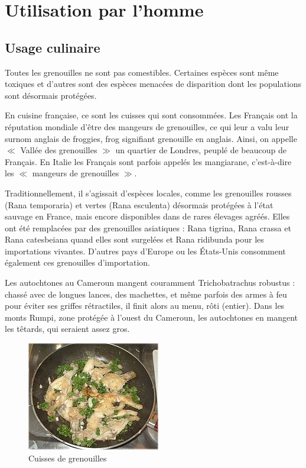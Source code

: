 \section{Utilisation par l'homme}

	\subsection{Usage culinaire}

Toutes les grenouilles ne sont pas comestibles. 
Certaines espèces sont même toxiques et d'autres sont des espèces menacées de disparition dont les populations sont désormais protégées.

En cuisine française, ce sont les cuisses qui sont consommées. 
Les Français ont la réputation mondiale d'être des mangeurs de grenouilles, ce qui leur a valu leur surnom anglais de froggies, frog signifiant grenouille en anglais. 
Ainsi, on appelle $\ll$ Vallée des grenouilles $\gg$ un quartier de Londres, peuplé de beaucoup de Français.
En Italie les Français sont parfois appelés les mangiarane, c'est-à-dire les $\ll$ mangeurs de grenouilles $\gg$.

Traditionnellement, il s'agissait d'espèces locales, comme les grenouilles rousses (Rana temporaria) et vertes (Rana esculenta) désormais protégées à l'état sauvage en France, mais encore disponibles dans de rares élevages agréés. 
Elles ont été remplacées par des grenouilles asiatiques : Rana tigrina, Rana crassa et Rana catesbeiana quand elles sont surgelées et Rana ridibunda pour les importations vivantes.
D'autres pays d'Europe ou les États-Unis consomment également ces grenouilles d'importation.

Les autochtones au Cameroun mangent couramment Trichobatrachus robustus : chassé avec de longues lances, des machettes, et même parfois des armes à feu pour éviter ses griffes rétractiles, il finit alors au menu, rôti (entier). 
Dans les monts Rumpi, zone protégée à l'ouest du Cameroun, les autochtones en mangent les têtards, qui seraient assez gros.

\begin{figure}
	
	\begin{center}
		\includegraphics[scale=1]{cuisine/miam.JPG}
			\caption{Cuisses de grenouilles}
			\label{fig:gre}
	\end{center}

\end{figure}

